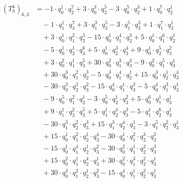 \begin{align*}(T_{h}^4)_{6,3}&=-1\cdot q_0^{1}\cdot q_2^{7}+3\cdot q_0^{3}\cdot q_2^{5}-3\cdot q_0^{5}\cdot q_2^{3}+1\cdot q_0^{7}\cdot q_2^{1}\\
&\quad -1\cdot q_1^{1}\cdot q_3^{7}+3\cdot q_1^{3}\cdot q_3^{5}-3\cdot q_1^{5}\cdot q_3^{3}+1\cdot q_1^{7}\cdot q_3^{1}\\
&\quad +3\cdot q_0^{1}\cdot q_1^{2}\cdot q_2^{5}-15\cdot q_0^{1}\cdot q_1^{4}\cdot q_2^{3}+5\cdot q_0^{1}\cdot q_1^{6}\cdot q_2^{1}\\
&\quad -5\cdot q_0^{1}\cdot q_2^{1}\cdot q_3^{6}+5\cdot q_0^{1}\cdot q_2^{3}\cdot q_3^{4}+9\cdot q_0^{1}\cdot q_2^{5}\cdot q_3^{2}\\
&\quad +3\cdot q_0^{2}\cdot q_1^{1}\cdot q_3^{5}+30\cdot q_0^{2}\cdot q_1^{3}\cdot q_3^{3}-9\cdot q_0^{2}\cdot q_1^{5}\cdot q_3^{1}\\
&\quad +30\cdot q_0^{3}\cdot q_1^{2}\cdot q_2^{3}-5\cdot q_0^{3}\cdot q_1^{4}\cdot q_2^{1}+15\cdot q_0^{3}\cdot q_2^{1}\cdot q_3^{4}\\
&\quad -30\cdot q_0^{3}\cdot q_2^{3}\cdot q_3^{2}-15\cdot q_0^{4}\cdot q_1^{1}\cdot q_3^{3}-5\cdot q_0^{4}\cdot q_1^{3}\cdot q_3^{1}\\
&\quad -9\cdot q_0^{5}\cdot q_1^{2}\cdot q_2^{1}-3\cdot q_0^{5}\cdot q_2^{1}\cdot q_3^{2}+5\cdot q_0^{6}\cdot q_1^{1}\cdot q_3^{1}\\
&\quad +9\cdot q_1^{1}\cdot q_2^{2}\cdot q_3^{5}+5\cdot q_1^{1}\cdot q_2^{4}\cdot q_3^{3}-5\cdot q_1^{1}\cdot q_2^{6}\cdot q_3^{1}\\
&\quad -30\cdot q_1^{3}\cdot q_2^{2}\cdot q_3^{3}+15\cdot q_1^{3}\cdot q_2^{4}\cdot q_3^{1}-3\cdot q_1^{5}\cdot q_2^{2}\cdot q_3^{1}\\
&\quad +15\cdot q_0^{1}\cdot q_1^{2}\cdot q_2^{1}\cdot q_3^{4}-30\cdot q_0^{1}\cdot q_1^{2}\cdot q_2^{3}\cdot q_3^{2}\\
&\quad -15\cdot q_0^{1}\cdot q_1^{4}\cdot q_2^{1}\cdot q_3^{2}-30\cdot q_0^{2}\cdot q_1^{1}\cdot q_2^{2}\cdot q_3^{3}\\
&\quad +15\cdot q_0^{2}\cdot q_1^{1}\cdot q_2^{4}\cdot q_3^{1}+30\cdot q_0^{2}\cdot q_1^{3}\cdot q_2^{2}\cdot q_3^{1}\\
&\quad +30\cdot q_0^{3}\cdot q_1^{2}\cdot q_2^{1}\cdot q_3^{2}-15\cdot q_0^{4}\cdot q_1^{1}\cdot q_2^{2}\cdot q_3^{1}\end{align*}
